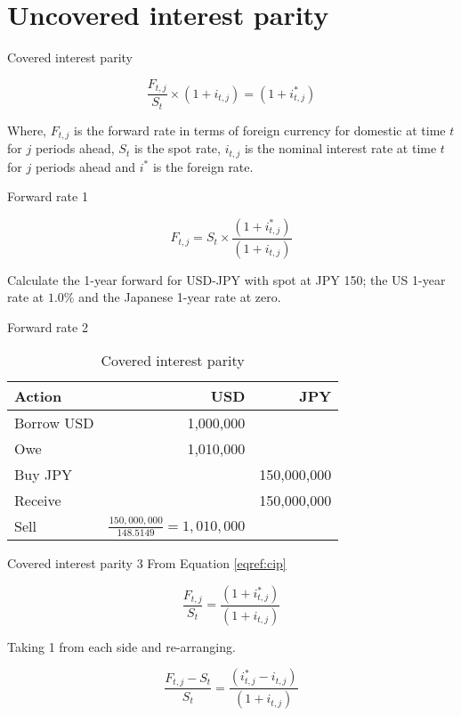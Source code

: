 \documentclass[14pt,xcolor=pdftex,dvipsnames,table]{beamer}\usepackage[]{graphicx}\usepackage[]{color}
\begin{document}
\section{Uncovered interest parity}
\begin{frame}{Covered interest parity}
\begin{block}{}
\begin{equation*}\label{eqref:uip}
\frac{F_{t, j}}{S_t} \times (1 + i_{t,j}) = (1 + i_{t,j}^*)  
\end{equation*}
\end{block}
Where, $F_{t, j}$ is the forward rate in terms of foreign currency for domestic at time $t$ for $j$ periods ahead, $S_t$ is the spot rate, $i_{t,j}$ is the nominal interest rate at time $t$ for $j$ periods ahead and $i^*$ is the foreign rate.
\end{frame}

\begin{frame}{Forward rate 1}
\begin{block}{}
\begin{equation}\label{eqref:cip}
{F_{t, j}} = {S_t} \times \frac{(1 + i_{t,j}^*)}{(1 + i_{t,j})}  
\end{equation}
\end{block}
Calculate the 1-year forward for USD-JPY with spot at JPY 150; the US 1-year rate at $1.0\%$ and the Japanese 1-year rate at zero. 
\end{frame}

\begin{frame}{Forward rate 2}
\begin{table}[h!]
\begin{center}
\begin{tabular}{l r r}
\textbf{Action} & \textbf{USD} & \textbf{JPY}\\
\hline
Borrow USD & 1,000,000 & \\
Owe & 1,010,000&  \\
Buy JPY & & 150,000,000\\
Receive & & 150,000,000\\
Sell & $\frac{150,000,000}{148.5149} = 1,010,000$ &
\end{tabular}
\end{center}
\caption{Covered interest parity}
\label{tabref:cip1}
\end{table}
\end{frame}

\begin{frame}{Covered interest parity 3}
From Equation \ref{eqref:cip}
\begin{block}{}
\begin{equation*}
\frac{F_{t,j}}{S_t} = \frac{(1 + i_{t, j}^*)}{(1 + i_{t, j})} 
\end{equation*}
\end{block}
Taking 1 from each side and re-arranging.
\begin{block}{}
\begin{equation}\label{eqref:cip3}
\frac{F_{t,j} - S_t}{S_t} = \frac{(i_{t,j}^* - i_{t,j})}{(1 + i_{t,j})} 
\end{equation}
\end{block}
\end{frame}
\end{document}
